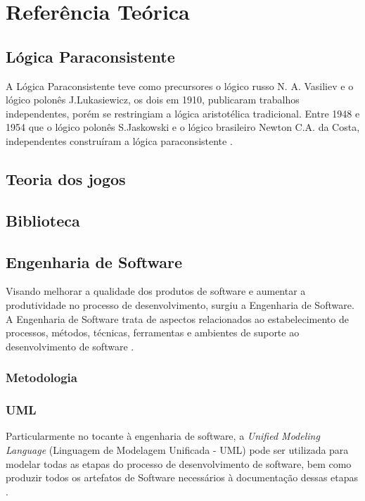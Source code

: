 
\chapter{Referência Teórica}

\section{Lógica Paraconsistente}

A Lógica Paraconsistente teve como precursores o lógico russo N. A. Vasiliev e o lógico polonês J.Lukasiewicz, os dois em 1910, publicaram trabalhos independentes, porém se restringiam a lógica aristotélica tradicional. Entre 1948 e 1954 que o lógico polonês S.Jaskowski e o lógico brasileiro Newton C.A. da Costa, independentes construíram a lógica paraconsistente \cite[p. 27]{tomda-decisao-lpa-2011}.

\section{Teoria dos jogos}

\section{Biblioteca}

\section{Engenharia de Software}

Visando melhorar a qualidade dos produtos de software e aumentar a produtividade no processo de desenvolvimento, surgiu a Engenharia de Software. A Engenharia de Software trata de aspectos relacionados ao estabelecimento de processos, métodos, técnicas, ferramentas e ambientes de suporte ao desenvolvimento de software \cite[p. 2]{eng-2014}.

\subsection{Metodologia}

\subsection{UML}

Particularmente no tocante à engenharia de software, a \textit{Unified Modeling Language} (Linguagem de Modelagem Unificada - UML) pode ser utilizada para modelar todas as etapas do processo de desenvolvimento de software, bem como produzir todos os artefatos de Software necessários à documentação dessas etapas \cite[p. 11-12]{eng-2015}.

